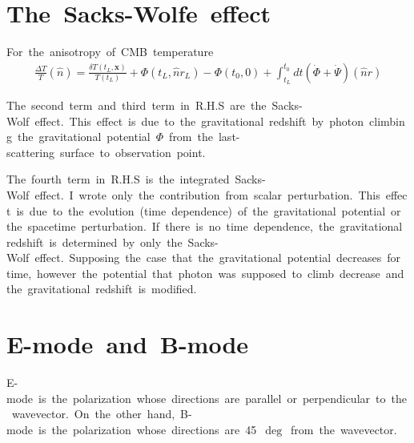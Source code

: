 \section{The\ Sacks-Wolfe\ effect}
For\ the\ anisotropy\ of\ CMB\ temperature
\begin{align*}
    \frac{\Delta T}{T}(\hat{n})=\frac{\delta T(t_L,\bm{x})}{T(t_L)}+\Phi(t_L,\hat{n}r_L)-\Phi(t_0,0)+\int^{t_0}_{t_L}dt(\Dot{\Phi}+\Dot{\Psi})(\hat{n}r)
\end{align*}

The\ second\ term\ and\ third\ term\ in\ R.H.S\ are\ the\ Sacks-Wolf\ effect.\ This\ effect\ is\ due\ to\ the\ gravitational\ redshift\ by\ photon\ climbing\ the\ gravitational\ potential\ $\Phi$\ from\ the\ last-scattering\ surface\ to\ observation\ point.

The\ fourth\ term\ in\ R.H.S\ is\ the\ integrated\ Sacks-Wolf\ effect.\ I\ wrote\ only\ the\ contribution\ from\ scalar\ perturbation.\ This\ effect\ is\ due\ to\ the\ evolution\ (time\ dependence)\ of\ the\ gravitational\ potential\ or\ the\ spacetime\ perturbation.\ If\ there\ is\ no\ time\ dependence,\ the\ gravitational\ redshift\ is\ determined\ by\ only\ the\ Sacks-Wolf\ effect.\ Supposing\ the\ case\ that\ the\ gravitational\ potential\ decreases\ for\ time,\ however\ the\ potential\ that\ photon\ was\ supposed\ to\ climb\ decrease\ and\ the\ gravitational\ redshift\ is\ modified.

\section{E-mode\ and\ B-mode}
E-mode\ is\ the\ polarization\ whose\ directions\ are\ parallel\ or\  perpendicular\ to\ the\ wavevector.\ On\ the\ other\ hand,\ B-mode\ is\ the\ polarization\ whose\ directions\ are\ 45\ $\deg$\ from\ the\ wavevector.

